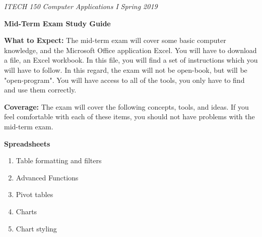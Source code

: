 \documentclass[a4paper, 11pt]{article}
\begin{document}
\noindent
\textit{ITECH 150} \hfill \textit{Computer Applications I} \hfill \textit{Spring 2019}
\begin{center}
\large\textbf{Mid-Term Exam Study Guide}
\end{center}

\large\textbf{What to Expect:}
The mid-term exam will cover some basic computer knowledge, and the Microsoft Office application Excel. You will have to download a file, an Excel workbook. In this file, you will find a set of instructions which you will have to follow. In this regard, the exam will not be open-book, but will be "open-program". You will have access to all of the tools, you only have to find and use them correctly.

\large\textbf{Coverage:}
The exam will cover the following concepts, tools, and ideas. If you feel comfortable with each of these items, you should not have problems with the mid-term exam.

\large\textbf{Spreadsheets}
\begin{enumerate}[noitemsep]
    \item Table formatting and filters
		\item Advanced Functions
    \item Pivot tables
    \item Charts
    \item Chart styling
\end{enumerate}
\end{document}
